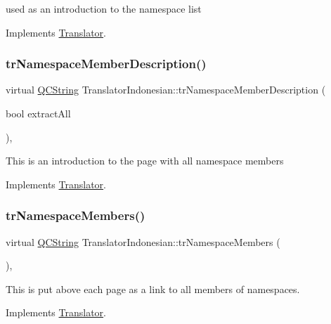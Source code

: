 used as an introduction to the namespace list 

Implements \mbox{\hyperlink{class_translator}{Translator}}.

\mbox{\label{class_translator_indonesian_ae3098dbe0ec37c45f27b5d8b38de7797}} 
\subsubsection{\texorpdfstring{trNamespaceMemberDescription()}{trNamespaceMemberDescription()}}
{\footnotesize\ttfamily virtual \mbox{\hyperlink{class_q_c_string}{Q\+C\+String}} Translator\+Indonesian\+::tr\+Namespace\+Member\+Description (\begin{DoxyParamCaption}\item[{bool}]{extract\+All }\end{DoxyParamCaption})\hspace{0.3cm}{\ttfamily [inline]}, {\ttfamily [virtual]}}

This is an introduction to the page with all namespace members 

Implements \mbox{\hyperlink{class_translator}{Translator}}.

\mbox{\label{class_translator_indonesian_a20e93fbead86335418c17700a90f0f2b}} 
\subsubsection{\texorpdfstring{trNamespaceMembers()}{trNamespaceMembers()}}
{\footnotesize\ttfamily virtual \mbox{\hyperlink{class_q_c_string}{Q\+C\+String}} Translator\+Indonesian\+::tr\+Namespace\+Members (\begin{DoxyParamCaption}{ }\end{DoxyParamCaption})\hspace{0.3cm}{\ttfamily [inline]}, {\ttfamily [virtual]}}

This is put above each page as a link to all members of namespaces. 

Implements \mbox{\hyperlink{class_translator}{Translator}}.

